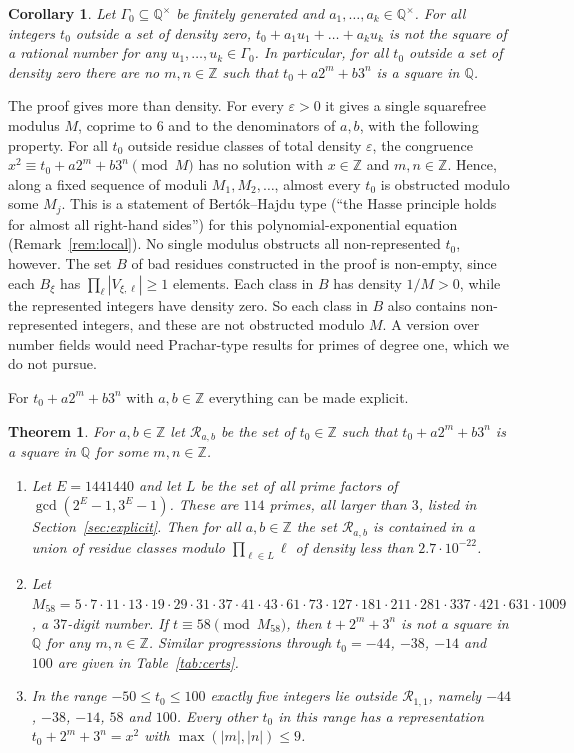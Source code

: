 \documentclass[11pt]{amsart}
\newtheorem{theorem}{Theorem}
\newtheorem{corollary}[lemma]{Corollary}
\theoremstyle{definition}
\theoremstyle{remark}
\newcommand{\Z}{\mathbb{Z}}
\newcommand{\Q}{\mathbb{Q}}
\newcommand{\R}{\mathcal{R}}
\begin{document}
\begin{corollary}\label{cor:CZ}
Let $\Gamma_0\subseteq\Q^\times$ be finitely generated and $a_1,\dots,a_k\in\Q^\times$.
For all integers $t_0$ outside a set of density zero, $t_0+a_1u_1+\dots+a_ku_k$ is not the square of a rational number for any $u_1,\dots,u_k\in\Gamma_0$.
In particular, for all $t_0$ outside a set of density zero there are no $m,n\in\Z$ such that $t_0+a2^m+b3^n$ is a square in $\Q$.
\end{corollary}

The proof gives more than density.
For every $\varepsilon>0$ it gives a single squarefree modulus $M$, coprime to $6$ and to the denominators of $a,b$, with the following property.
For all $t_0$ outside residue classes of total density $\varepsilon$, the congruence $x^2\equiv t_0+a2^m+b3^n\pmod M$ has no solution with $x\in\Z$ and $m,n\in\Z$.
Hence, along a fixed sequence of moduli $M_1,M_2,\dots$, almost every $t_0$ is obstructed modulo some $M_j$.
This is a statement of Bert\'ok--Hajdu type (``the Hasse principle holds for almost all right-hand sides'') for this polynomial-exponential equation (Remark~\ref{rem:local}).
No single modulus obstructs all non-represented $t_0$, however.
The set $B$ of bad residues constructed in the proof is non-empty, since each $B_\xi$ has $\prod_\ell|V_{\xi,\ell}|\ge1$ elements.
Each class in $B$ has density $1/M>0$, while the represented integers have density zero.
So each class in $B$ also contains non-represented integers, and these are not obstructed modulo $M$.
A version over number fields would need Prachar-type results for primes of degree one, which we do not pursue.

For $t_0+a2^m+b3^n$ with $a,b\in\Z$ everything can be made explicit.

\begin{theorem}\label{thm:C}
For $a,b\in\Z$ let $\R_{a,b}$ be the set of $t_0\in\Z$ such that $t_0+a2^m+b3^n$ is a square in $\Q$ for some $m,n\in\Z$.
\begin{enumerate}
\item Let $E=1441440$ and let $L$ be the set of all prime factors of $\gcd(2^E-1,3^E-1)$.
These are $114$ primes, all larger than $3$, listed in Section~\ref{sec:explicit}.
Then for all $a,b\in\Z$ the set $\R_{a,b}$ is contained in a union of residue classes modulo $\prod_{\ell\in L}\ell$ of density less than $2.7\cdot10^{-22}$.
\item Let $M_{58}=5\cdot7\cdot11\cdot13\cdot19\cdot29\cdot31\cdot37\cdot41\cdot43\cdot61\cdot73\cdot127\cdot181\cdot211\cdot281\cdot337\cdot421\cdot631\cdot1009$, a $37$-digit number.
If $t\equiv58\pmod{M_{58}}$, then $t+2^m+3^n$ is not a square in $\Q$ for any $m,n\in\Z$.
Similar progressions through $t_0=-44$, $-38$, $-14$ and $100$ are given in Table~\ref{tab:certs}.
\item In the range $-50\le t_0\le100$ exactly five integers lie outside $\R_{1,1}$, namely $-44$, $-38$, $-14$, $58$ and $100$.
Every other $t_0$ in this range has a representation $t_0+2^m+3^n=x^2$ with $\max(|m|,|n|)\le9$.
\end{enumerate}
\end{theorem}
\end{document}
